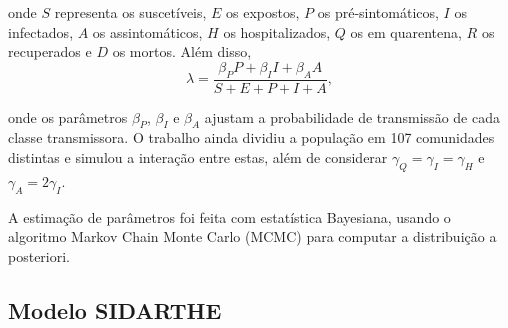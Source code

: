 \documentclass{article}
\begin{document}
	\noindent onde $S$ representa os suscetíveis, $E$ os expostos, $P$ os pré-sintomáticos, $I$ os infectados, $A$ os assintomáticos, $H$ os hospitalizados, $Q$ os em quarentena, $R$ os recuperados e $D$ os mortos. Além disso, 
	\[\lambda = \frac{\beta_P P + \beta_I I + \beta_A A}{S + E + P + I + A},\]
	
	\noindent onde os parâmetros $\beta_P$, $\beta_I$ e $\beta_A$ ajustam a probabilidade de transmissão de cada classe transmissora. O trabalho ainda dividiu a população em 107 comunidades distintas e simulou a interação entre estas, além de considerar $\gamma_Q = \gamma_I = \gamma_H$ e $\gamma_A = 2\gamma_I$.
	
	A estimação de parâmetros foi feita com estatística Bayesiana, usando o algoritmo Markov Chain Monte Carlo (MCMC) para computar a distribuição a posteriori.
	
	\subsection{Modelo SIDARTHE}
	
\end{document}
